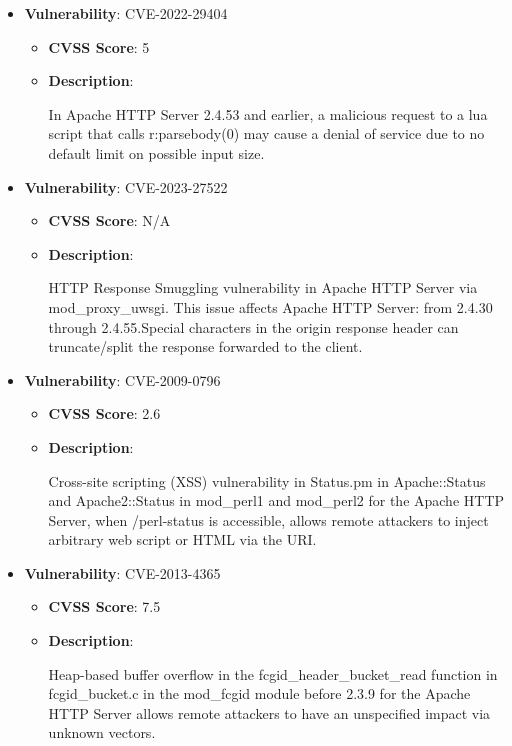 \documentclass{article}
\begin{document}
\begin{itemize}
        \item \textbf{Vulnerability}: CVE-2022-29404
        \begin{itemize}
            \item \textbf{CVSS Score}:  5 
            \item \textbf{Description}:
            \parbox[t]{0.9\linewidth}{
                \ttfamily In Apache HTTP Server 2.4.53 and earlier, a malicious request to a lua script that calls r:parsebody(0) may cause a denial of service due to no default limit on possible input size.
            }
        \end{itemize}
    
        \item \textbf{Vulnerability}: CVE-2023-27522
        \begin{itemize}
            \item \textbf{CVSS Score}:  N/A 
            \item \textbf{Description}:
            \parbox[t]{0.9\linewidth}{
                \ttfamily HTTP Response Smuggling vulnerability in Apache HTTP Server via mod\_proxy\_uwsgi. This issue affects Apache HTTP Server: from 2.4.30 through 2.4.55.Special characters in the origin response header can truncate/split the response forwarded to the client.
            }
        \end{itemize}
    
        \item \textbf{Vulnerability}: CVE-2009-0796
        \begin{itemize}
            \item \textbf{CVSS Score}:  2.6 
            \item \textbf{Description}:
            \parbox[t]{0.9\linewidth}{
                \ttfamily Cross-site scripting (XSS) vulnerability in Status.pm in Apache::Status and Apache2::Status in mod\_perl1 and mod\_perl2 for the Apache HTTP Server, when /perl-status is accessible, allows remote attackers to inject arbitrary web script or HTML via the URI.
            }
        \end{itemize}
    
        \item \textbf{Vulnerability}: CVE-2013-4365
        \begin{itemize}
            \item \textbf{CVSS Score}:  7.5 
            \item \textbf{Description}:
            \parbox[t]{0.9\linewidth}{
                \ttfamily Heap-based buffer overflow in the fcgid\_header\_bucket\_read function in fcgid\_bucket.c in the mod\_fcgid module before 2.3.9 for the Apache HTTP Server allows remote attackers to have an unspecified impact via unknown vectors.
            }
        \end{itemize}
    

\end{itemize}
\end{document}
